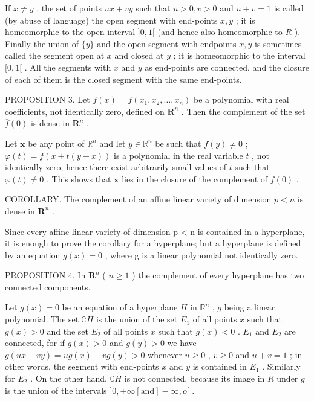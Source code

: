 If \(x \neq y\) , the set of points \(ux + vy\) such that \(u > 0, v > 0\) and \(u + v = 1\) is called (by abuse of language) the open segment with end-points \(x, y\) ; it is homeomorphic to the open interval \(]0, 1[\) (and hence also homeomorphic to \(R\) ). Finally the union of \(\{y\}\) and the open segment with endpoints \(x, y\) is sometimes called the segment open at \(x\) and closed at \(y\) ; it is homeomorphic to the interval \([0, 1[\) . All the segments with \(x\) and \(y\) as end-points are connected, and the closure of each of them is the closed segment with the same end-points.

PROPOSITION 3. Let \(f(x) = f(x_1, x_2, \ldots, x_n)\) be a polynomial with real coefficients, not identically zero, defined on \(\mathbf{R}^n\) . Then the complement of the set \(\overline{f}(0)\) is dense in \(\mathbf{R}^n\) .

Let \(\pmb{x}\) be any point of \(\mathbb{R}^n\) and let \(y \in \mathbb{R}^n\) be such that \(f(y) \neq 0\) ; \(\varphi(t) = f(x + t(y - x))\) is a polynomial in the real variable \(t\) , not identically zero; hence there exist arbitrarily small values of \(t\) such that \(\varphi(t) \neq 0\) . This shows that \(\pmb{x}\) lies in the closure of the complement of \(\overline{f}(0)\) .

COROLLARY. The complement of an affine linear variety of dimension \(p < n\) is dense in \(\mathbf{R}^n\) .

Since every affine linear variety of dimension p \textless{} n is contained in a hyperplane, it is enough to prove the corollary for a hyperplane; but a hyperplane is defined by an equation \(g(x) = 0\) , where g is a linear polynomial not identically zero.

PROPOSITION 4. In \(\mathbf{R}^n\) ( \(n \geqslant 1\) ) the complement of every hyperplane has two connected components.

Let \(g(x) = 0\) be an equation of a hyperplane \(H\) in \(\mathbb{R}^n\) , \(g\) being a linear polynomial. The set \(\complement H\) is the union of the set \(E_1\) of all points \(x\) such that \(g(x) > 0\) and the set \(E_2\) of all points \(x\) such that \(g(x) < 0\) . \(E_1\) and \(E_2\) are connected, for if \(g(x) > 0\) and \(g(y) > 0\) we have \(g(ux + vy) = ug(x) + vg(y) > 0\) whenever \(u \geqslant 0\) , \(v \geqslant 0\) and \(u + v = 1\) ; in other words, the segment with end-points \(x\) and \(y\) is contained in \(E_1\) . Similarly for \(E_2\) . On the other hand, \(\complement H\) is not connected, because its image in \(R\) under \(g\) is the union of the intervals \(]0, +\infty[ \text{and}] - \infty, o[\) .

